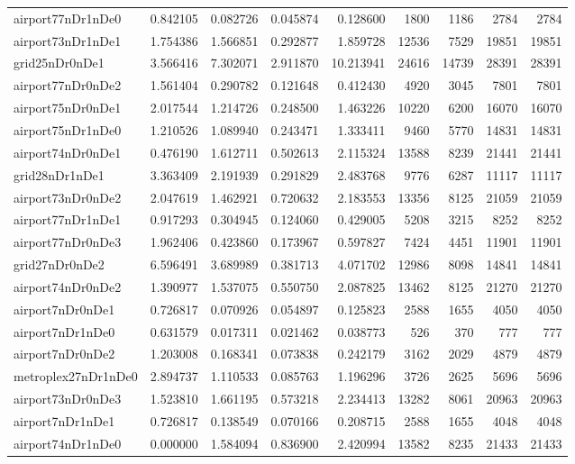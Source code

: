 \begin{longtable}{|l|r|r|r|r|r|r|r|r|}
airport77nDr1nDe0 & 0.842105 & 0.082726 & 0.045874 & 0.128600 & 1800 & 1186 & 2784 & 2784 \\
airport73nDr1nDe1 & 1.754386 & 1.566851 & 0.292877 & 1.859728 & 12536 & 7529 & 19851 & 19851 \\
grid25nDr0nDe1 & 3.566416 & 7.302071 & 2.911870 & 10.213941 & 24616 & 14739 & 28391 & 28391 \\
airport77nDr0nDe2 & 1.561404 & 0.290782 & 0.121648 & 0.412430 & 4920 & 3045 & 7801 & 7801 \\
airport75nDr0nDe1 & 2.017544 & 1.214726 & 0.248500 & 1.463226 & 10220 & 6200 & 16070 & 16070 \\
airport75nDr1nDe0 & 1.210526 & 1.089940 & 0.243471 & 1.333411 & 9460 & 5770 & 14831 & 14831 \\
airport74nDr0nDe1 & 0.476190 & 1.612711 & 0.502613 & 2.115324 & 13588 & 8239 & 21441 & 21441 \\
grid28nDr1nDe1 & 3.363409 & 2.191939 & 0.291829 & 2.483768 & 9776 & 6287 & 11117 & 11117 \\
airport73nDr0nDe2 & 2.047619 & 1.462921 & 0.720632 & 2.183553 & 13356 & 8125 & 21059 & 21059 \\
airport77nDr1nDe1 & 0.917293 & 0.304945 & 0.124060 & 0.429005 & 5208 & 3215 & 8252 & 8252 \\
airport77nDr0nDe3 & 1.962406 & 0.423860 & 0.173967 & 0.597827 & 7424 & 4451 & 11901 & 11901 \\
grid27nDr0nDe2 & 6.596491 & 3.689989 & 0.381713 & 4.071702 & 12986 & 8098 & 14841 & 14841 \\
airport74nDr0nDe2 & 1.390977 & 1.537075 & 0.550750 & 2.087825 & 13462 & 8125 & 21270 & 21270 \\
airport7nDr0nDe1 & 0.726817 & 0.070926 & 0.054897 & 0.125823 & 2588 & 1655 & 4050 & 4050 \\
airport7nDr1nDe0 & 0.631579 & 0.017311 & 0.021462 & 0.038773 & 526 & 370 & 777 & 777 \\
airport7nDr0nDe2 & 1.203008 & 0.168341 & 0.073838 & 0.242179 & 3162 & 2029 & 4879 & 4879 \\
metroplex27nDr1nDe0 & 2.894737 & 1.110533 & 0.085763 & 1.196296 & 3726 & 2625 & 5696 & 5696 \\
airport73nDr0nDe3 & 1.523810 & 1.661195 & 0.573218 & 2.234413 & 13282 & 8061 & 20963 & 20963 \\
airport7nDr1nDe1 & 0.726817 & 0.138549 & 0.070166 & 0.208715 & 2588 & 1655 & 4048 & 4048 \\
airport74nDr1nDe0 & 0.000000 & 1.584094 & 0.836900 & 2.420994 & 13582 & 8235 & 21433 & 21433 \\

\end{longtable}
